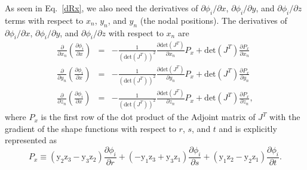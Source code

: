 As seen in Eq.\ \eqref{dRx}, we also need the derivatives of $\partial \phi_i/\partial x$, $\partial \phi_i/\partial y$, and $\partial \phi_i/\partial z$ terms with respect to $x_n$, $y_n$, and $y_n$ (the nodal positions). The derivatives of $\partial \phi_i/\partial x$, $\partial \phi_i/\partial y$, and $\partial \phi_i/\partial z$ with respect to $x_n$ are
%
\begin{eqnarray}
\frac{\partial}{\partial x_n} \left( \frac{\partial \phi_i}{\partial x} \right) &=&  -\frac{1}{(\text{det}(J^T))^2} \frac{\partial \text{det}(J^T)}{\partial x_n} P_x + \text{det}(J^T) \frac{\partial P_x}{\partial x_n}\nonumber\\
\frac{\partial}{\partial y_n} \left( \frac{\partial \phi_i}{\partial x} \right) &=& -\frac{1}{(\text{det}(J^T))^2} \frac{\partial \text{det}(J^T)}{\partial y_n} P_x + \text{det}(J^T) \frac{\partial P_x}{\partial y_n} \nonumber\\
\frac{\partial}{\partial z_n} \left( \frac{\partial \phi_i}{\partial x} \right) &=& -\frac{1}{(\text{det}(J^T))^2} \frac{\partial \text{det}(J^T)}{\partial z_n} P_x + \text{det}(J^T) \frac{\partial P_x}{\partial z_n} ,
\label{d2phi_dxdxn}
\end{eqnarray}
%
where $P_x$ is the first row of the dot product of the Adjoint matrix of $J^T$ with the gradient of the shape functions with respect to $r$, $s$, and $t$ and is explicitly represented as
%
\begin{equation}
P_x \equiv \left(\text{y}_2 \text{z}_3 - \text{y}_3 \text{z}_2\right) \frac{\partial \phi_i}{\partial r} + \left(-\text{y}_1 \text{z}_3 + \text{y}_3 \text{z}_1\right) \frac{\partial \phi_i}{\partial s} + \left(\text{y}_1 \text{z}_2 - \text{y}_2 \text{z}_1\right) \frac{\partial \phi_i}{\partial t}.
\label{Px}
\end{equation}
%


